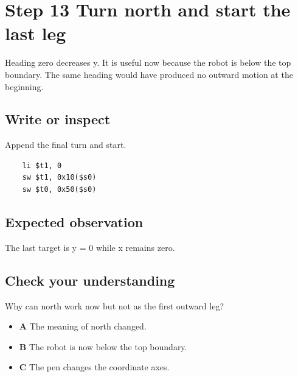 \section{Step 13 Turn north and start the last
  leg}\label{006-marsbot-square-s13-step-13-turn-north-and-start-the-last-leg}

Heading zero decreases y. It is useful now because the robot is below
the top boundary. The same heading would have produced no outward motion
at the beginning.

\subsection{Write or
  inspect}\label{006-marsbot-square-s13-write-or-inspect}

Append the final turn and start.

\begin{verbatim}
    li $t1, 0
    sw $t1, 0x10($s0)
    sw $t0, 0x50($s0)
\end{verbatim}

\subsection{Expected
  observation}\label{006-marsbot-square-s13-expected-observation}

The last target is y = 0 while x remains zero.

\subsection{Check your
  understanding}\label{006-marsbot-square-s13-check-your-understanding}

Why can north work now but not as the first outward leg?

\begin{itemize}
  \tightlist
  \item
        \textbf{A} The meaning of north changed.
  \item
        \textbf{B} The robot is now below the top boundary.
  \item
        \textbf{C} The pen changes the coordinate axes.
\end{itemize}
